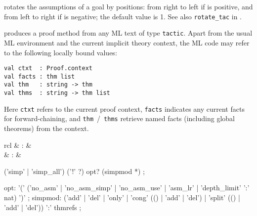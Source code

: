 \begin{isabellebody}
\begin{isamarkuptext}
\begin{descr}
  \item [\hyperlink{method.rotate_tac}{\mbox{\isa{rotate{\isacharunderscore}tac}}}~\isa{n}] rotates the assumptions of a
  goal by  positions: from right to left if  is
  positive, and from left to right if  is negative; the
  default value is 1.  See also \verb|rotate_tac| in
  \cite[\S3]{isabelle-ref}.

  \item [\hyperlink{method.tactic}{\mbox{\isa{tactic}}}~\isa{{\isachardoublequote}text{\isachardoublequote}}] produces a proof method from
  any ML text of type \verb|tactic|.  Apart from the usual ML
  environment and the current implicit theory context, the ML code may
  refer to the following locally bound values:

{\footnotesize\begin{verbatim}
val ctxt  : Proof.context
val facts : thm list
val thm   : string -> thm
val thms  : string -> thm list
\end{verbatim}}

  Here \verb|ctxt| refers to the current proof context, \verb|facts| indicates any current facts for forward-chaining, and \verb|thm|~/~\verb|thms| retrieve named facts (including global theorems)
  from the context.

  \end{descr}%
\end{isamarkuptext}%
\isamarkuptrue%
%
\isamarkuptrue%
%
\isamarkuptrue%
%
\begin{isamarkuptext}%
\begin{matharray}{rcl}
    \hypertarget{method.simp}{\hyperlink{method.simp}{\mbox{}}} & : & \isarmeth \\
    \hypertarget{method.simp_all}{\hyperlink{method.simp_all}{\mbox{}}} & : & \isarmeth \\
  \end{matharray}

  \begin{rail}
    ('simp' | 'simp\_all') ('!' ?) opt? (simpmod *)
    ;

    opt: '(' ('no\_asm' | 'no\_asm\_simp' | 'no\_asm\_use' | 'asm\_lr' | 'depth\_limit' ':' nat) ')'
    ;
    simpmod: ('add' | 'del' | 'only' | 'cong' (() | 'add' | 'del') |
      'split' (() | 'add' | 'del')) ':' thmrefs
    ;
  \end{rail}


\end{isamarkuptext}
\end{isabellebody}
